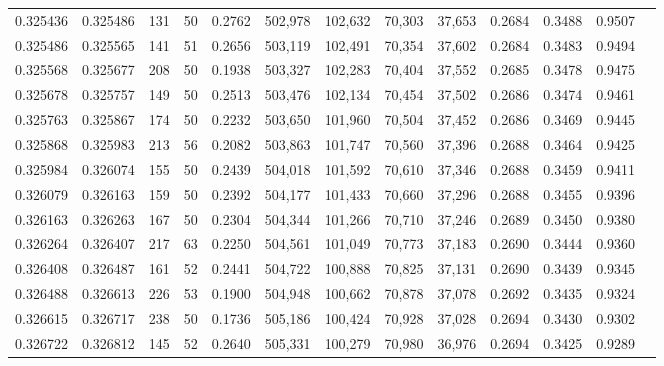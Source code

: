 \begin{tabular}{rrrrrrrrrrrrr}
0.325436 & 0.325486 &   131 &  50 &                                     0.2762 & 502,978 & 102,632 &  70,303 &  37,653 & 0.2684 & 0.3488 & 0.9507 \\
0.325486 & 0.325565 &   141 &  51 &                                     0.2656 & 503,119 & 102,491 &  70,354 &  37,602 & 0.2684 & 0.3483 & 0.9494 \\
0.325568 & 0.325677 &   208 &  50 &                                     0.1938 & 503,327 & 102,283 &  70,404 &  37,552 & 0.2685 & 0.3478 & 0.9475 \\
0.325678 & 0.325757 &   149 &  50 &                                     0.2513 & 503,476 & 102,134 &  70,454 &  37,502 & 0.2686 & 0.3474 & 0.9461 \\
0.325763 & 0.325867 &   174 &  50 &                                     0.2232 & 503,650 & 101,960 &  70,504 &  37,452 & 0.2686 & 0.3469 & 0.9445 \\
0.325868 & 0.325983 &   213 &  56 &                                     0.2082 & 503,863 & 101,747 &  70,560 &  37,396 & 0.2688 & 0.3464 & 0.9425 \\
0.325984 & 0.326074 &   155 &  50 &                                     0.2439 & 504,018 & 101,592 &  70,610 &  37,346 & 0.2688 & 0.3459 & 0.9411 \\
0.326079 & 0.326163 &   159 &  50 &                                     0.2392 & 504,177 & 101,433 &  70,660 &  37,296 & 0.2688 & 0.3455 & 0.9396 \\
0.326163 & 0.326263 &   167 &  50 &                                     0.2304 & 504,344 & 101,266 &  70,710 &  37,246 & 0.2689 & 0.3450 & 0.9380 \\
0.326264 & 0.326407 &   217 &  63 &                                     0.2250 & 504,561 & 101,049 &  70,773 &  37,183 & 0.2690 & 0.3444 & 0.9360 \\
0.326408 & 0.326487 &   161 &  52 &                                     0.2441 & 504,722 & 100,888 &  70,825 &  37,131 & 0.2690 & 0.3439 & 0.9345 \\
0.326488 & 0.326613 &   226 &  53 &                                     0.1900 & 504,948 & 100,662 &  70,878 &  37,078 & 0.2692 & 0.3435 & 0.9324 \\
0.326615 & 0.326717 &   238 &  50 &                                     0.1736 & 505,186 & 100,424 &  70,928 &  37,028 & 0.2694 & 0.3430 & 0.9302 \\
0.326722 & 0.326812 &   145 &  52 &                                     0.2640 & 505,331 & 100,279 &  70,980 &  36,976 & 0.2694 & 0.3425 & 0.9289 \\

\end{tabular}

